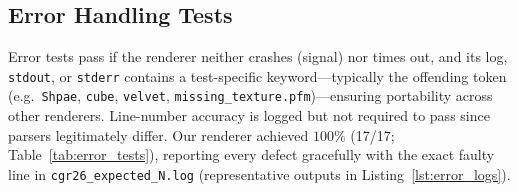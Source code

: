 \documentclass{article}
\begin{document}
\subsection{Error Handling Tests}

Error tests pass if the renderer neither crashes (signal) nor times out, and its log, \verb|stdout|, or \verb|stderr| contains a test-specific keyword—typically the offending token (e.g.\ \verb|Shpae|, \verb|cube|, \verb|velvet|, \verb|missing_texture.pfm|)—ensuring portability across other renderers. Line-number accuracy is logged but not required to pass since parsers legitimately differ. Our renderer achieved $100\%$ (17/17; Table~\ref{tab:error_tests}), reporting every defect gracefully with the exact faulty line in \verb|cgr26_expected_N.log| (representative outputs in Listing~\ref{lst:error_logs}).
\end{document}
